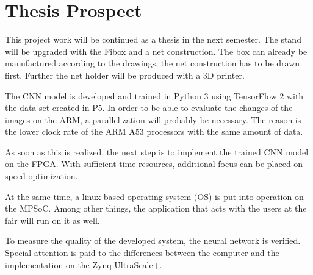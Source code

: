 \section{Thesis Prospect}
\label{sec:thesis_prospect}

This project work will be continued as a thesis in the next semester.
The stand will be upgraded with the Fibox and a net construction.
The box can already be manufactured according to the drawings, the net construction has to be drawn first.
Further the net holder will be produced with a 3D printer.

The CNN model is developed and trained in Python 3 using TensorFlow 2 with the data set created in P5.
In order to be able to evaluate the changes of the images on the ARM, a parallelization will probably be necessary.
The reason is the lower clock rate of the ARM A53 processors with the same amount of data.

As soon as this is realized, the next step is to implement the trained CNN model on the FPGA.
With sufficient time resources, additional focus can be placed on speed optimization.

At the same time, a linux-based operating system (OS) is put into operation on the MPSoC.
Among other things, the application that acts with the users at the fair will run on it as well.

To measure the quality of the developed system, the neural network is verified.
Special attention is paid to the differences between the computer and the implementation on the Zynq UltraScale+.
